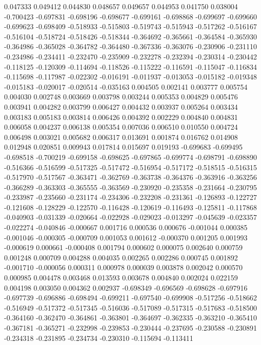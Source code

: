 0.047333
0.049412
0.044830
0.048657
0.049657
0.044953
0.041750
0.038004
-0.700423
-0.697831
-0.698196
-0.698677
-0.699161
-0.698868
-0.699697
-0.699660
-0.699623
-0.698409
-0.518933
-0.515803
-0.519743
-0.515943
-0.517262
-0.516167
-0.516104
-0.518724
-0.518426
-0.518344
-0.364692
-0.365661
-0.364584
-0.365930
-0.364986
-0.365028
-0.364782
-0.364480
-0.367336
-0.363076
-0.230906
-0.231110
-0.234986
-0.234411
-0.232470
-0.235909
-0.232278
-0.232394
-0.230314
-0.230442
-0.118125
-0.120309
-0.114694
-0.118526
-0.115222
-0.116591
-0.115047
-0.116834
-0.115698
-0.117987
-0.022302
-0.016191
-0.011937
-0.013053
-0.015182
-0.019348
-0.015183
-0.020017
-0.020514
-0.035163
0.004505
0.002141
0.003777
0.005754
0.004030
0.002748
0.003669
0.003798
0.003244
0.005353
0.004829
0.005476
0.003941
0.004282
0.003799
0.006427
0.004432
0.003937
0.005264
0.003434
0.003183
0.005183
0.003814
0.006426
0.004392
0.002229
0.004840
0.004831
0.006058
0.004237
0.006138
0.005354
0.007036
0.006510
0.010550
0.004724
0.006498
0.003021
0.005682
0.006317
0.013691
0.001874
0.016762
0.014908
0.012948
0.020851
0.009943
0.017814
0.015697
0.019193
-0.699683
-0.699495
-0.698518
-0.700219
-0.699158
-0.698625
-0.697865
-0.699774
-0.698791
-0.698890
-0.516366
-0.516599
-0.517325
-0.517472
-0.516954
-0.517172
-0.518515
-0.516315
-0.517970
-0.517567
-0.363471
-0.362769
-0.363738
-0.364376
-0.363916
-0.363256
-0.366289
-0.363303
-0.365555
-0.363569
-0.230920
-0.235358
-0.231664
-0.230795
-0.233987
-0.235660
-0.231174
-0.234306
-0.232208
-0.231361
-0.126893
-0.122727
-0.121608
-0.128229
-0.122570
-0.116428
-0.120619
-0.116493
-0.125811
-0.117868
-0.040903
-0.031339
-0.020664
-0.022928
-0.029023
-0.013297
-0.045639
-0.023357
-0.022274
-0.040846
-0.000667
0.001716
0.000536
0.000676
-0.001044
0.000385
-0.001046
-0.000305
-0.000709
0.001053
0.001612
-0.000370
0.001205
0.001993
-0.000619
0.000661
-0.000408
0.001794
0.000602
0.000075
0.002640
0.000759
0.001248
0.000709
0.004288
0.004035
0.002265
0.002286
0.000745
0.001892
-0.001710
-0.000056
0.000311
0.000978
0.000039
0.003878
0.002042
0.000570
0.000985
0.004478
0.003468
0.013593
0.003678
0.004840
0.002024
0.022159
0.004198
0.003050
0.004362
0.002937
-0.698349
-0.696569
-0.698628
-0.697916
-0.697739
-0.696886
-0.698494
-0.699211
-0.697540
-0.699908
-0.517256
-0.518662
-0.516949
-0.517372
-0.517345
-0.516036
-0.517089
-0.517315
-0.517683
-0.518500
-0.364160
-0.362470
-0.364861
-0.363801
-0.364697
-0.362335
-0.363210
-0.365410
-0.367181
-0.365271
-0.232998
-0.239853
-0.230444
-0.237695
-0.230588
-0.230891
-0.234318
-0.231895
-0.234734
-0.230310
-0.115694
-0.113411
